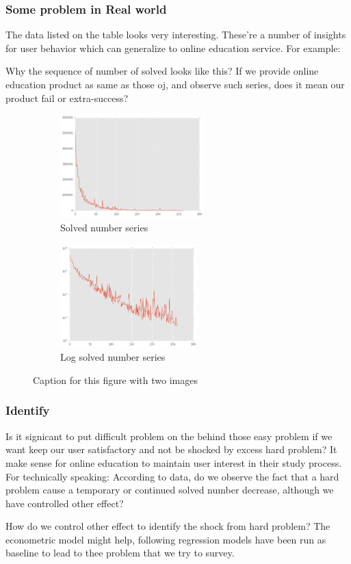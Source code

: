 \documentclass{beamer}
\begin{document}
\begin{frame}
\frametitle{Some problem in Real world}

The data listed on the table looks very interesting. These're a number of insights for user behavior which 
can generalize to online education service. For example:

Why the sequence of number of solved looks like this? If we provide online education product as same as those oj, 
and observe such series, does it mean our product fail or extra-success?

\begin{figure}[h]
 
\begin{subfigure}{0.45\textwidth}
\includegraphics[width=0.9\linewidth, height=4cm]{solved-seq1.png} 
\caption{Solved number series}
\label{fig:f1}
\end{subfigure}
\begin{subfigure}{0.45\textwidth}
\includegraphics[width=0.9\linewidth, height=4cm]{solved-seq2.png}
\caption{Log solved number series}
\label{fig:f2}
\end{subfigure}
 
\caption{Caption for this figure with two images}
\label{fig:image2}

\end{figure}

\end{frame}

\begin{frame}

\frametitle{Identify}

Is it signicant to put difficult problem on the behind those easy problem 
if we want keep our user satisfactory and not be shocked by excess hard problem? It make sense
for online education to maintain user interest in their study process. For technically speaking:
According to data, do we observe the fact that a hard problem cause a temporary 
or continued solved number decrease, although we have controlled other effect? 

How do we control other effect to identify the shock from hard problem? The econometric model might help, 
following regression models have been run as baseline to lead to thee problem that we try to survey.

\end{frame}
\end{document}
